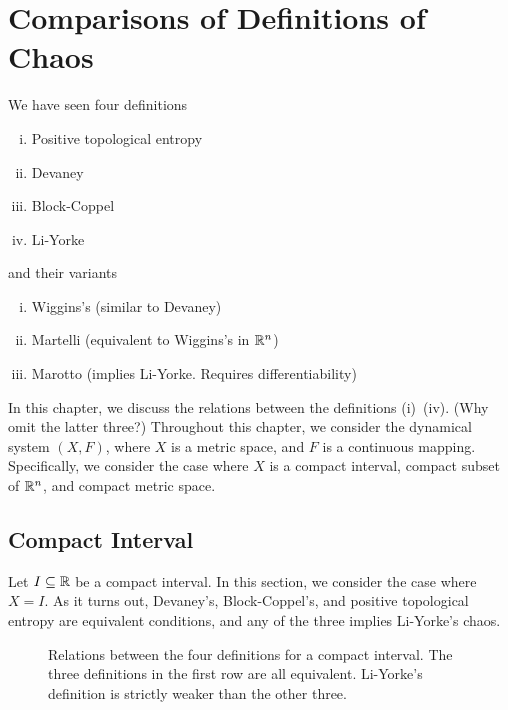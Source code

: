 \documentclass[12pt,twoside,draft]{book}
\begin{document}
\chapter{Comparisons of Definitions of Chaos}
We have seen four definitions 
\begin{enumerate}[(i)]
  \item Positive topological entropy
  \item Devaney
  \item Block-Coppel
  \item Li-Yorke
\end{enumerate}
and their variants
\begin{enumerate}[(i)]
  \item Wiggins's (similar to Devaney)
  \item Martelli (equivalent to Wiggins's in $\mathbb{R}^n$)
  \item Marotto (implies Li-Yorke. Requires differentiability)
\end{enumerate}
In this chapter, we discuss the relations between the definitions (i)~(iv).
(Why omit the latter three?)
Throughout this chapter, we consider the dynamical system $(X,F)$, where $X$ is a metric space, and $F$ is a continuous mapping.
Specifically, we consider the case where $X$ is a compact interval, compact subset of $\mathbb{R}^n$, and compact metric space.


\section{Compact Interval}
Let $I \subseteq \mathbb{R}$ be a compact interval.
In this section, we consider the case where $X = I$.
As it turns out, Devaney's, Block-Coppel's, and positive topological entropy are equivalent conditions, and any of the three implies Li-Yorke's chaos.
\begin{figure}[ht]
  \label{fig:chaos-interval}
  \caption{
    Relations between the four definitions for a compact interval.
    The three definitions in the first row are all equivalent.
    Li-Yorke's definition is strictly weaker than the other three.
  }
\end{figure}
\end{document}
